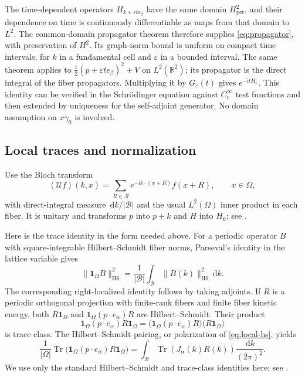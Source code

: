 \documentclass[11pt,a4paper]{article}
\newcommand{\R}{\mathbb R}
\newcommand{\ind}{\mathbf 1}
\newcommand{\BZ}{\mathcal B}
\newcommand{\lat}{\mathcal R}
\newcommand{\dd}{\,\mathrm d}
\newcommand{\ii}{\mathrm i}
\DeclareMathOperator{\Tr}{Tr}
\theoremstyle{remark}
\numberwithin{equation}{section}
\begin{document}
The time-dependent operators $H_{k+\varepsilon t e_\beta}$ have the
same domain $H^2_{\mathrm{per}}$, and their dependence on time is
continuously differentiable as maps from that domain to $L^2$.
The common-domain propagator theorem \cite[Theorem X.70]{RS2}
therefore supplies \eqref{eq:propagator}, with preservation of $H^2$.
Its graph-norm bound is uniform on compact time intervals, for $k$
in a fundamental cell and $\varepsilon$ in a bounded interval.
The same theorem applies to $\tfrac12(p+\varepsilon t e_\beta)^2+V$
on $L^2(\R^2)$; its propagator is the direct integral of the fiber
propagators. Multiplying it by $G_\varepsilon(t)$ gives
$e^{-\ii tH_\varepsilon}$. This identity can be verified in the
Schr\"odinger equation against $C_c^\infty$ test functions and then
extended by uniqueness for the self-adjoint generator. No domain
assumption on $x\gamma_0$ is involved.

\subsection{Local traces and normalization}
\label{app:traces}

Use the Bloch transform
\[
 (\mathcal Uf)(k,x)
 =\sum_{R\in\lat}e^{-\ii k\cdot(x+R)}f(x+R),\qquad x\in\Omega,
\]
with direct-integral measure $\dd k/|\BZ|$ and the usual $L^2(\Omega)$
inner product in each fiber. It is unitary and transforms $p$ into
$p+k$ and $H$ into $H_k$; see
\cite[Theorems XIII.97--XIII.99]{RS4}.

Here is the trace identity in the form needed above. For a periodic
operator $B$ with square-integrable Hilbert--Schmidt fiber norms,
Parseval's identity in the lattice variable gives
\begin{equation}
 \|\ind_\Omega B\|_{\mathrm{HS}}^2
 =\frac1{|\BZ|}\int_\BZ\|B(k)\|_{\mathrm{HS}}^2\dd k.
 \label{eq:local-hs}
\end{equation}
The corresponding right-localized identity follows by taking
adjoints. If $R$ is a periodic orthogonal projection with finite-rank
fibers and finite fiber kinetic energy, both $R\ind_\Omega$ and
$\ind_\Omega(p\cdot e_\alpha)R$ are Hilbert--Schmidt.
Their product
\[
 \ind_\Omega(p\cdot e_\alpha)R\ind_\Omega
 =\bigl(\ind_\Omega(p\cdot e_\alpha)R\bigr)
       \bigl(R\ind_\Omega\bigr)
\]
is trace class. The Hilbert--Schmidt pairing, or polarization of
\eqref{eq:local-hs}, yields
\begin{equation}
 \frac1{|\Omega|}
 \Tr\bigl(\ind_\Omega(p\cdot e_\alpha)R\ind_\Omega\bigr)
 =\int_\BZ\Tr(J_\alpha(k)R(k))\frac{\dd k}{(2\pi)^2}.
 \label{eq:bloch-trace}
\end{equation}
We use only the standard Hilbert--Schmidt and trace-class identities
here; see \cite[Section VI.6]{RS1}.
\end{document}
